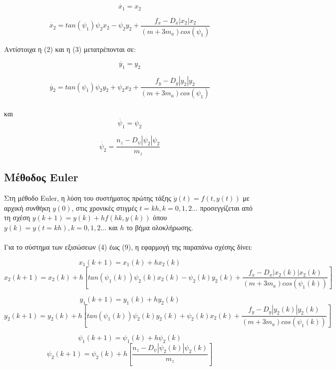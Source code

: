 \documentclass{article}
\begin{document}
\begin{equation}
\dot{x_1} = x_2
\end{equation}

\begin{equation}
\dot{x_2} = tan(\psi_1)\psi_2x_2 - \psi_2y_2 + \frac{f_x - D_x|x_2|x_2}{(m + 3m_a)cos(\psi_1)} 
\end{equation}

Αντίστοιχα η (2) και η (3) μετατρέπονται σε:

\begin{equation}
\dot{y_1} = y_2
\end{equation}

\begin{equation}
\dot{y_2} = tan(\psi_1)\psi_2y_2 + \psi_2x_2 + \frac{f_y - D_y|y_2|y_2}{(m + 3m_a)cos(\psi_1)} 
\end{equation}
\\
και
\\
\begin{equation}
\dot{\psi_1} = \psi_2
\end{equation}

\begin{equation}
\dot{\psi_2} = \frac{n_z - D_\psi|\psi_2|\psi_2}{m_z} 
\end{equation}

\subsection{Μέθοδος Euler}
Στη μέθοδο Euler, η λύση του συστήματος πρώτης τάξης \(\dot{y}(t) = f(t, y(t))\) με αρχική συνθήκη \(y(0)\), στις χρονικές στιγμές \(t = kh, k = 0, 1, 2...\) προσεγγίζεται από τη σχέση \(y(k+1) = y(k) + hf(hk, y(k))\) όπου \(y(k) = y(t = kh), k = 0, 1, 2...\) και \(h\) το βήμα ολοκλήρωσης.
\\\\
Για το σύστημα των εξισώσεων (4) έως (9), η εφαρμογή της παραπάνω σχέσης δίνει:

\[x_1(k+1) = x_1(k) + hx_2(k)\]
\[x_2(k+1) = x_2(k) + h[tan(\psi_1(k))\psi_2(k)x_2(k) - \psi_2(k)y_2(k) + \frac{f_x - D_x|x_2(k)|x_2(k)}{(m + 3m_a)cos(\psi_1(k))}]\]

\[ y_1(k+1)   = y_1(k) + hy_2(k)   \]
\[y_2(k+1) = y_2(k) + h[tan(\psi_1(k))\psi_2(k)y_2(k) + \psi_2(k)x_2(k) + \frac{f_y - D_y|y_2(k)|y_2(k)}{(m + 3m_a)cos(\psi_1(k))}]\]


\[ \psi_1(k+1)   = \psi_1(k) + h\psi_2(k)   \]
\[ \psi_2(k+1) = \psi_2(k) + h[\frac{n_z - D_\psi|\psi_2(k)|\psi_2(k)}{m_z}]\]
\end{document}
